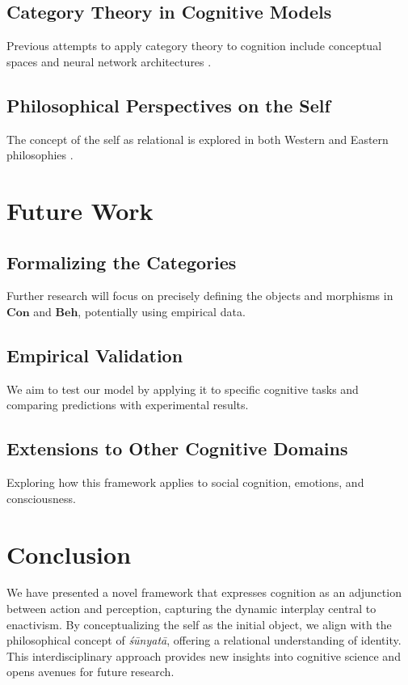 \documentclass{article}
\begin{document}
\subsection{Category Theory in Cognitive Models}

Previous attempts to apply category theory to cognition include conceptual spaces \cite{gardenfors2004} and neural network architectures \cite{spivak2014}.

\subsection{Philosophical Perspectives on the Self}

The concept of the self as relational is explored in both Western \cite{heidegger1962} and Eastern philosophies \cite{garfield1995}.

\section{Future Work}

\subsection{Formalizing the Categories}

Further research will focus on precisely defining the objects and morphisms in $\mathbf{Con}$ and $\mathbf{Beh}$, potentially using empirical data.

\subsection{Empirical Validation}

We aim to test our model by applying it to specific cognitive tasks and comparing predictions with experimental results.

\subsection{Extensions to Other Cognitive Domains}

Exploring how this framework applies to social cognition, emotions, and consciousness.

\section{Conclusion}

We have presented a novel framework that expresses cognition as an adjunction between action and perception, capturing the dynamic interplay central to enactivism. By conceptualizing the self as the initial object, we align with the philosophical concept of \emph{śūnyatā}, offering a relational understanding of identity. This interdisciplinary approach provides new insights into cognitive science and opens avenues for future research.
\end{document}
